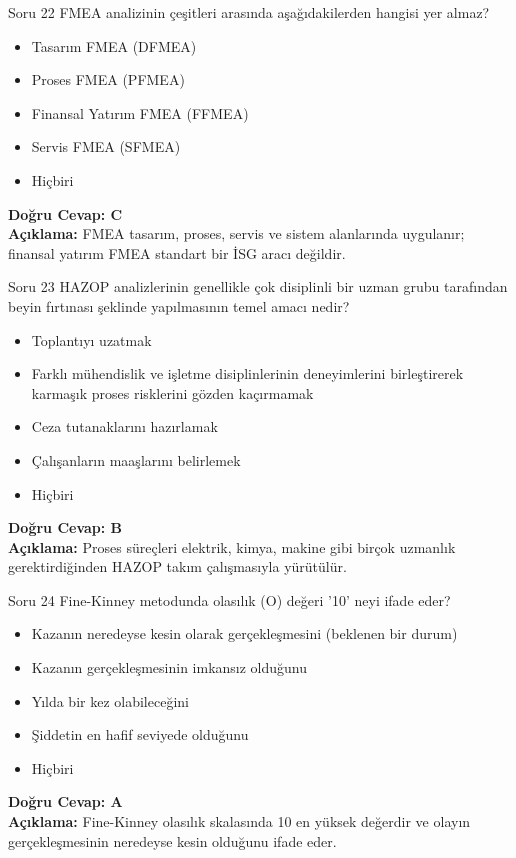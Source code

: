 \documentclass[12pt,a4paper]{article}
\begin{document}
\begin{testcard}{Soru 22}
    FMEA analizinin çeşitleri arasında aşağıdakilerden hangisi yer almaz?
    \begin{itemize}
        \item[A)] Tasarım FMEA (DFMEA)
        \item[B)] Proses FMEA (PFMEA)
        \item[C)] Finansal Yatırım FMEA (FFMEA)
        \item[D)] Servis FMEA (SFMEA)
        \item[E)] Hiçbiri
    \end{itemize}
    \tcblower
    \textbf{Doğru Cevap: C} \\
    \textbf{Açıklama:} FMEA tasarım, proses, servis ve sistem alanlarında uygulanır; finansal yatırım FMEA standart bir İSG aracı değildir.
\end{testcard}

\begin{testcard}{Soru 23}
    HAZOP analizlerinin genellikle çok disiplinli bir uzman grubu tarafından beyin fırtınası şeklinde yapılmasının temel amacı nedir?
    \begin{itemize}
        \item[A)] Toplantıyı uzatmak
        \item[B)] Farklı mühendislik ve işletme disiplinlerinin deneyimlerini birleştirerek karmaşık proses risklerini gözden kaçırmamak
        \item[C)] Ceza tutanaklarını hazırlamak
        \item[D)] Çalışanların maaşlarını belirlemek
        \item[E)] Hiçbiri
    \end{itemize}
    \tcblower
    \textbf{Doğru Cevap: B} \\
    \textbf{Açıklama:} Proses süreçleri elektrik, kimya, makine gibi birçok uzmanlık gerektirdiğinden HAZOP takım çalışmasıyla yürütülür.
\end{testcard}

\begin{testcard}{Soru 24}
    Fine-Kinney metodunda olasılık (O) değeri '10' neyi ifade eder?
    \begin{itemize}
        \item[A)] Kazanın neredeyse kesin olarak gerçekleşmesini (beklenen bir durum)
        \item[B)] Kazanın gerçekleşmesinin imkansız olduğunu
        \item[C)] Yılda bir kez olabileceğini
        \item[D)] Şiddetin en hafif seviyede olduğunu
        \item[E)] Hiçbiri
    \end{itemize}
    \tcblower
    \textbf{Doğru Cevap: A} \\
    \textbf{Açıklama:} Fine-Kinney olasılık skalasında 10 en yüksek değerdir ve olayın gerçekleşmesinin neredeyse kesin olduğunu ifade eder.
\end{testcard}
\end{document}
